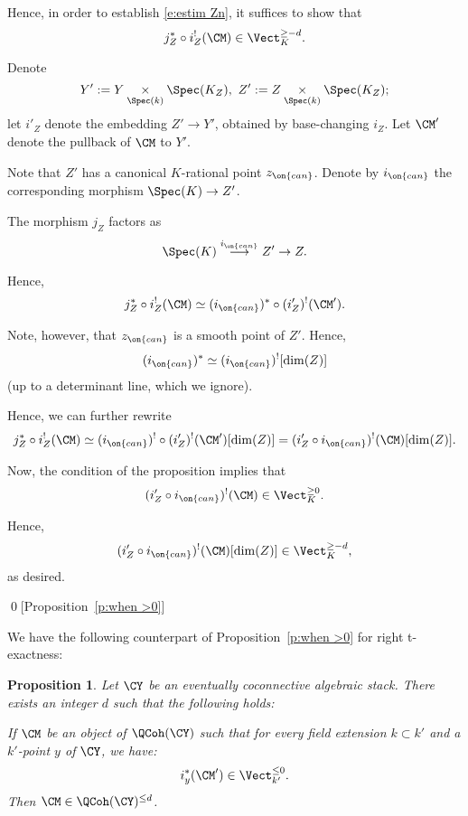 \documentclass[9pt]{amsart}
\newtheorem{prop}[subsubsection]{Proposition}
\theoremstyle{remark}
\theoremstyle{definition}
\theoremstyle{remark}
\newcommand{\propref}[1]{Proposition~\ref{#1}}
\numberwithin{equation}{section}
\begin{document}
\medskip

Hence, in order to establish \eqref{e:estim Zn}, it suffices to show that 
\begin{equation} \label{e:estim Z}
 j_Z^*\circ i_Z^!(\CM)\in \Vect_{K}^{\geq -d}.
\end{equation} 

\sssec{}

Denote
$$Y':=Y\underset{\Spec(k)}\times \Spec(K_Z),\,\, Z':=Z\underset{\Spec(k)}\times \Spec(K_Z);$$
let $i'_Z$ denote the embedding $Z'\to Y'$, obtained by base-changing $i_Z$. 
Let $\CM'$ denote the pullback of $\CM$ to $Y'$. 

\medskip

Note that $Z'$ has a canonical $K$-rational point $z_{\on{can}}$. Denote by
$i_{\on{can}}$ the corresponding morphism $\Spec(K) \to Z'$. 

\medskip

The morphism 
$j_Z$ factors as
$$\Spec(K) \overset{i_{\on{can}}}\longrightarrow Z' \to Z.$$

Hence, 
$$j_Z^*\circ i_Z^!(\CM)\simeq (i_{\on{can}})^*\circ (i'_Z)^!(\CM').$$

\sssec{}

Note, however, that $z_{\on{can}}$ is a smooth point of $Z'$. Hence,
$$(i_{\on{can}})^* \simeq (i_{\on{can}})^![\dim(Z)]$$
(up to a determinant line, which we ignore).

\medskip

Hence, we can further rewrite
$$j_Z^*\circ i_Z^!(\CM)\simeq (i_{\on{can}})^!\circ (i'_Z)^!(\CM')[\dim(Z)]=
(i'_Z\circ i_{\on{can}})^!(\CM)[\dim(Z)].$$

\sssec{}

Now, the 
condition of the proposition implies that
$$(i'_Z\circ i_{\on{can}})^!(\CM)\in \Vect_K^{\geq 0}.$$

Hence,
$$(i'_Z\circ i_{\on{can}})^!(\CM)[\dim(Z)]\in \Vect_K^{\geq -d},$$
as desired. 

\qed[\propref{p:when >0}]

\ssec{Proof of \propref{p:bdd right}} \label{ss:bdd right}

\sssec{}

We have the following counterpart of \propref{p:when >0} for right t-exactness:

\begin{prop} \label{p:when <0}
Let $\CY$ be an eventually coconnective algebraic stack. There exists an integer $d$ such that the
following holds: 

\medskip

If $\CM$ be an object of $\QCoh(\CY)$ such that for every field extension $k\subset k'$ and a $k'$-point $y$ of $\CY$, we have:
$$i_y^*(\CM')\in \Vect_{k'}^{\leq 0}.$$
Then $\CM\in \QCoh(\CY)^{\leq d}$. 
\end{prop}
\end{document}
